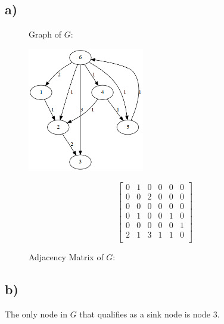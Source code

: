 \documentclass{article}
\begin{document}
        \subsection*{a)}
        \begin{figure}[ht] %
            \centering
            \begin{minipage}[t]{0.5\textwidth}
                \centering
                \captionsetup{labelformat=empty} %
                \caption{Graph of $G$:}
                \includegraphics[width=2in]{multi.png}
            \end{minipage}%
            \begin{minipage}[t]{0.5\textwidth}
                \captionsetup{labelformat=empty} %
                \caption{Adjacency Matrix of $G$:}
                \[
                \begin{bmatrix}
                    0 & 1 & 0 & 0 & 0 & 0 \\
                    0 & 0 & 2 & 0 & 0 & 0 \\
                    0 & 0 & 0 & 0 & 0 & 0 \\
                    0 & 1 & 0 & 0 & 1 & 0 \\
                    0 & 0 & 0 & 0 & 0 & 1 \\
                    2 & 1 & 3 & 1 & 1 & 0 \\
                \end{bmatrix}
                \]
            \end{minipage}
        \end{figure}

        \subsection*{b)}
        The only node in $G$ that qualifies as a sink node is node $3$.
\end{document}
